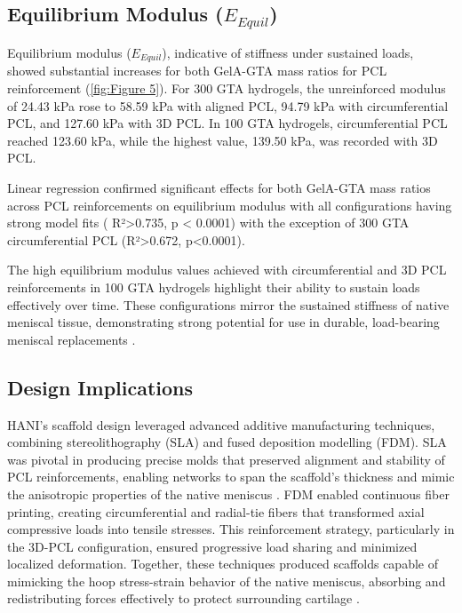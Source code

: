 \subsection{Equilibrium Modulus ($E_{Equil}$)}

Equilibrium modulus ($E_{Equil}$), indicative of stiffness under sustained loads, showed substantial increases for both GelA-GTA mass ratios for PCL reinforcement (\autoref{fig:Figure 5}). For 300 GTA hydrogels, the unreinforced modulus of 24.43 kPa rose to 58.59 kPa with aligned PCL, 94.79 kPa with circumferential PCL, and 127.60 kPa with 3D PCL. In 100 GTA hydrogels, circumferential PCL reached 123.60 kPa, while the highest value, 139.50 kPa, was recorded with 3D PCL.

Linear regression confirmed significant effects for both GelA-GTA mass ratios across PCL reinforcements on equilibrium modulus with all configurations having strong model fits ( R²>0.735,  p < 0.0001) with the exception of 300 GTA circumferential PCL (R²>0.672, p<0.0001). 

The high equilibrium modulus values achieved with circumferential and 3D PCL reinforcements in 100 GTA hydrogels highlight their ability to sustain loads effectively over time. These configurations mirror the sustained stiffness of native meniscal tissue, demonstrating strong potential for use in durable, load-bearing meniscal replacements \cite{21,60,61,62}.


\subsection{Design Implications}

HANI's scaffold design leveraged advanced additive manufacturing techniques, combining stereolithography (SLA) and fused deposition modelling (FDM). SLA was pivotal in producing precise molds that preserved alignment and stability of PCL reinforcements, enabling networks to span the scaffold's thickness and mimic the anisotropic properties of the native meniscus \cite{Filardo2019,Klarmann2023,Bahcecioglu2019,Coluccino2017}. FDM enabled continuous fiber printing, creating circumferential and radial-tie fibers that transformed axial compressive loads into tensile stresses. This reinforcement strategy, particularly in the 3D-PCL configuration, ensured progressive load sharing and minimized localized deformation. Together, these techniques produced scaffolds capable of mimicking the hoop stress-strain behavior of the native meniscus, absorbing and redistributing forces effectively to protect surrounding cartilage \cite{Filardo2019,Guo2021,Armiento2018,Visser2015}.

